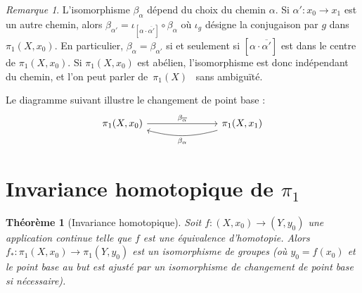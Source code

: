 \documentclass[12pt,a4paper,openany]{book}
\theoremstyle{definition}
\theoremstyle{plain}
\newtheorem{theoreme}[definition]{Théorème}
\theoremstyle{remark}
\newtheorem{remarque}[definition]{Remarque}
\providecommand{\og}{\guillemotleft\,}
\providecommand{\fg}{\,\guillemotright}
\begin{document}
\begin{remarque}\label{rem:changement-base-non-canonique}
L'isomorphisme $\beta_\alpha$ dépend du choix du chemin $\alpha$. Si
$\alpha' : x_0 \to x_1$ est un autre chemin, alors
$\beta_{\alpha'} = \iota_{[\alpha \cdot \overline{\alpha'}]} \circ \beta_\alpha$
où $\iota_g$ désigne la conjugaison par $g$ dans $\pi_1(X, x_0)$. En
particulier, $\beta_\alpha = \beta_{\alpha'}$ si et seulement si
$[\alpha \cdot \overline{\alpha'}]$ est dans le centre de $\pi_1(X, x_0)$. Si
$\pi_1(X, x_0)$ est abélien, l'isomorphisme est donc indépendant du chemin, et
l'on peut parler de \og $\pi_1(X)$ \fg{} sans ambiguïté.
\end{remarque}

Le diagramme suivant illustre le changement de point base :
\[
\begin{tikzcd}[row sep=large, column sep=large]
\pi_1(X, x_0) \arrow[rr, "\beta_{\overline{\alpha}}"] & & \pi_1(X, x_1) \arrow[ll, bend left=15, "\beta_\alpha"]
\end{tikzcd}
\]

\section{Invariance homotopique de $\pi_1$}\label{sec:invariance-homotopique}

\begin{theoreme}[Invariance homotopique]\label{thm:pi1-invariance-homotopique}
Soit $f : (X, x_0) \to (Y, y_0)$ une application continue telle que $f$ est une
équivalence d'homotopie. Alors
$f_* : \pi_1(X, x_0) \to \pi_1(Y, y_0)$ est un isomorphisme de groupes (où
$y_0 = f(x_0)$ et le point base au but est ajusté par un isomorphisme de
changement de point base si nécessaire).
\end{theoreme}
\end{document}
